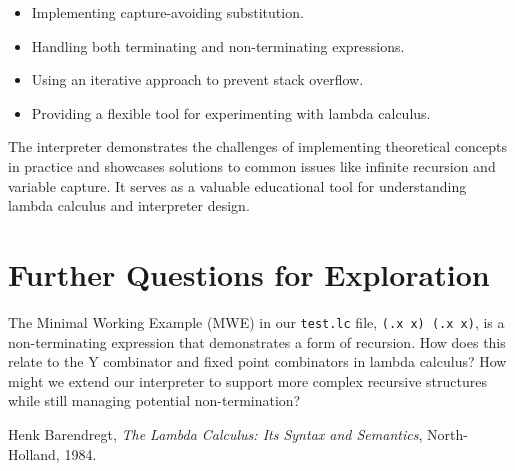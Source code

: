 \begin{itemize}
    \item Implementing capture-avoiding substitution.
    \item Handling both terminating and non-terminating expressions.
    \item Using an iterative approach to prevent stack overflow.
    \item Providing a flexible tool for experimenting with lambda calculus.
\end{itemize}

The interpreter demonstrates the challenges of implementing theoretical concepts in practice and showcases solutions to common issues like infinite recursion and variable capture. It serves as a valuable educational tool for understanding lambda calculus and interpreter design.

\section{Further Questions for Exploration}

The Minimal Working Example (MWE) in our \texttt{test.lc} file, \texttt{(\x.x x) (\x.x x)}, is a non-terminating expression that demonstrates a form of recursion. How does this relate to the Y combinator and fixed point combinators in lambda calculus? How might we extend our interpreter to support more complex recursive structures while still managing potential non-termination?

\begin{thebibliography}{9}
 Henk Barendregt, \emph{The Lambda Calculus: Its Syntax and Semantics}, North-Holland, 1984.
\end{thebibliography}


